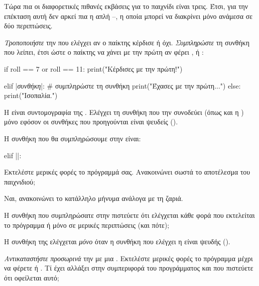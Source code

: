 \documentclass[a4paper,11pt,oneside]{book}
\begin{document}
Τώρα πια οι διαφορετικές πιθανές εκβάσεις για το παιχνίδι είναι τρεις. Έτσι, για την επέκταση αυτή δεν αρκεί πια η απλή --, η οποία μπορεί να διακρίνει μόνο ανάμεσα σε δύο περιπτώσεις.

\begin{step}
\emph{Τροποποιήστε} την  που ελέγχει αν ο παίκτης κέρδισε ή όχι. \emph{Συμπληρώστε} τη συνθήκη που λείπει, έτσι ώστε ο παίκτης να χάνει με την πρώτη αν φέρει ,  ή :

\begin{pyplain}
if roll == 7 or roll == 11:
    print("Κέρδισες με την πρώτη!")
\end{pyplain}
\begin{pynew}
elif |\textrm{\textit{συνθήκη}}|:   # συμπληρώστε τη συνθήκη
    print("Έχασες με την πρώτη...")
else:
    print("Ισοπαλία.")
\end{pynew}

Η  είναι συντομογραφία της . Ελέγχει τη συνθήκη που την συνοδεύει (όπως και η ) μόνο εφόσον οι συνθήκες που προηγούνται είναι ψευδείς ().

\begin{answer}
Η συνθήκη που θα συμπληρώσουμε στην  είναι:

\begin{pyplain}
elif ||:
\end{pyplain}
\end{answer}

Εκτελέστε μερικές φορές το πρόγραμμά σας. Ανακοινώνει σωστά το αποτέλεσμα του παιχνιδιού;

\begin{answer}
Ναι, ανακοινώνει το κατάλληλο μήνυμα ανάλογα με τη ζαριά.
\end{answer}

Η συνθήκη που συμπληρώσατε στην  πιστεύετε ότι ελέγχεται κάθε φορά που εκτελείται το πρόγραμμα ή μόνο σε μερικές περιπτώσεις (και πότε);

\begin{answer}
Η συνθήκη της  ελέγχεται \emph{μόνο} όταν η συνθήκη που ελέγχει η  είναι ψευδής ().
\end{answer}

\emph{Αντικαταστήστε προσωρινά} την  με μια . Εκτελέστε μερικές φορές το πρόγραμμα μέχρι να φέρετε  ή .
Τί έχει αλλάξει στην συμπεριφορά του προγράμματος και που πιστεύετε ότι οφείλεται αυτό;


\end{step}
\end{document}
